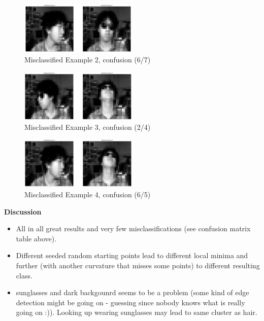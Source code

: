\documentclass[12pt,a4paper]{article}
\begin{document}
\begin{figure}[H]
	\centering
  \includegraphics[width=0.5\textwidth]{figures/2_2_img2.png}
	\caption{Misclassified Example 2, confusion (6/7)}
	\label{2_2_img2}
\end{figure}

\begin{figure}[H]
	\centering
  \includegraphics[width=0.5\textwidth]{figures/2_2_img3.png}
	\caption{Misclassified Example 3, confusion (2/4)}
	\label{2_2_img3}
\end{figure}

\begin{figure}[H]
	\centering
  \includegraphics[width=0.5\textwidth]{figures/2_2_img5.png}
	\caption{Misclassified Example 4, confusion (6/5)}
	\label{2_2_img5}
\end{figure}

\newpage
\textbf{Discussion}

\begin{itemize}
  \item All in all great results and very few misclassifications (see confusion
  matrix table above).
  \item Different seeded random starting points lead to different local minima
  and further (with another curvature that misses some points) to different
  resulting class.
  \item sunglasses and dark backgounrd seems to be a problem (some kind of edge
  detection might be going on - guessing since nobody knows what is really going
  on :)). Looking up wearing sunglasses may lead to same cluster as hair.
\end{itemize}

\newpage
\printbibliography
\end{document}
